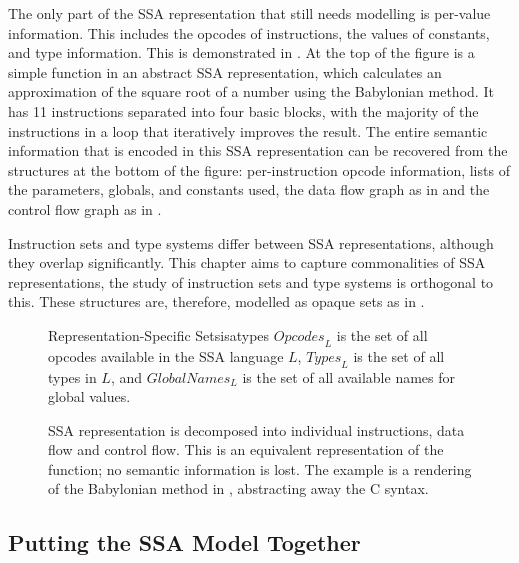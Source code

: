     The only part of the SSA representation that still needs modelling is
    per-value information.
    This includes the opcodes of instructions, the values of constants,
    and type information.
    This is demonstrated in .
    At the top of the figure is a simple function in an abstract SSA
    representation, which calculates an approximation of the square root of a
    number using the Babylonian method.
    It has 11 instructions separated into four basic blocks, with the majority
    of the instructions in a loop that iteratively improves the result.
    The entire semantic information that is encoded in this SSA representation
    can be recovered from the structures at the bottom of the figure:
    per-instruction opcode information, lists of the parameters, globals, and
    constants used, the data flow graph as in  and the control
    flow graph as in .

    Instruction sets and type systems differ between SSA representations,
    although they overlap significantly.
    This chapter aims to capture commonalities of SSA representations, the study
    of instruction sets and type systems is orthogonal to this.
    These structures are, therefore, modelled as opaque sets as in
    .

\begin{figure}[h]
\begin{definition}{Representation-Specific Sets}{isatypes}
    $\textit{Opcodes}_L$ is the set of all opcodes available in the SSA language
    $L$, $\textit{Types}_L$ is the set of all types in $L$, and
    $\textit{GlobalNames}_L$ is the set of all available names for global
    values.
\end{definition}
\end{figure}

\begin{figure}[p]

\caption{SSA representation is decomposed into individual instructions, data
         flow and control flow.
         This is an equivalent representation of the function; no semantic
         information is lost.
         The example is a rendering of the Babylonian method in
         , abstracting away the C syntax.}
\label{fig:separation}
\end{figure}

\subsection{Putting the SSA Model Together}

